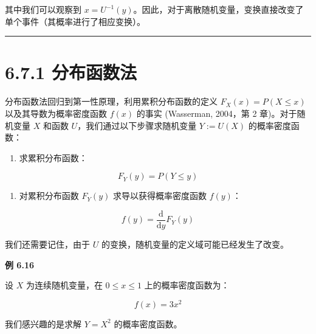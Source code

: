 其中我们可以观察到 $ x = U^{-1}(y) $。因此，对于离散随机变量，变换直接改变了单个事件（其概率进行了相应变换）。

\medskip\hrule\medskip

\section*{6.7.1 分布函数法}

分布函数法回归到第一性原理，利用累积分布函数的定义 $ F_X(x) = P(X \leqslant x) $ 以及其导数为概率密度函数 $ f(x) $ 的事实 (Wasserman, 2004，第 2 章)。对于随机变量 $ X $ 和函数 $ U $，我们通过以下步骤求随机变量 $ Y := U(X) $ 的概率密度函数：

\begin{enumerate}
\item 求累积分布函数：
\end{enumerate}

\begin{equation}
F_Y(y) = P(Y \leqslant y)
\tag{6.126}\label{eq:6-126}
\end{equation}

\begin{enumerate}
\item 对累积分布函数 $ F_Y(y) $ 求导以获得概率密度函数 $ f(y) $：
\end{enumerate}

\begin{equation}
f(y) = \frac{\mathrm{d}}{\mathrm{d}y} F_Y(y)
\tag{6.127}\label{eq:6-127}
\end{equation}

我们还需要记住，由于 $ U $ 的变换，随机变量的定义域可能已经发生了改变。

\begin{notebox}
\textbf{例 6.16}
\end{notebox}

\begin{notebox}
设 $ X $ 为连续随机变量，在 $ 0 \leqslant x \leqslant 1 $ 上的概率密度函数为：

\begin{equation}
f(x) = 3x^2
\tag{6.128}\label{eq:6-128}
\end{equation}

我们感兴趣的是求解 $ Y = X^2 $ 的概率密度函数。
\end{notebox}

